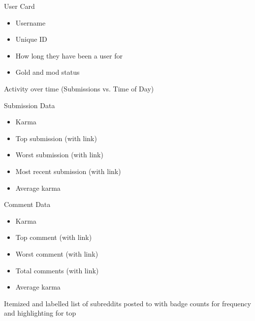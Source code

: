 \documentclass[msc,oneside]{ubcthesis}%
\newenvironment{twocolitemize}{%
\begin{itemize}
\begin{multicols}{2}
}{%
\end{multicols}
\end{itemize}
}
\begin{document}
\begin{twocolitemize}
\item{User Card}
	\begin{itemize}
	\item{Username}
	\item{Unique ID}
	\item{How long they have been a user for}
	\item{Gold and mod status}
	\end{itemize}
\item{Activity over time (Submissions vs. Time of Day)}
\item{Submission Data}
	\begin{itemize}
	\item{Karma}
	\item{Top submission (with link)}
	\item{Worst submission (with link)}
	\item{Most recent submission (with link)}
	\item{Average karma}
	\end{itemize}
\item{Comment Data}
	\begin{itemize}
	\item{Karma}
	\item{Top comment (with link)}
	\item{Worst comment (with link)}
	\item{Total comments (with link)}
	\item{Average karma}
	\end{itemize}
\item{Itemized and labelled list of subreddits posted to with badge counts for frequency and highlighting for top}
\end{twocolitemize}
\end{document}
